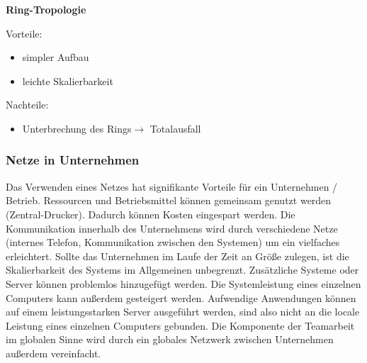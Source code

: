 \documentclass[12pt,a4paper]{article}
\begin{document}
\begin{minipage}[t]{.48\textwidth}
				\vspace{0.3cm}
				{\normalsize\textbf{Ring-Tropologie}}\newline\newline
				\begin{flushright}
				\end{flushright}
				\footnotesize Vorteile:
				\begin{itemize}
					\footnotesize
					\item simpler Aufbau
					\item leichte Skalierbarkeit
					\end{itemize}
					\footnotesize Nachteile:
					\begin{itemize}
						\footnotesize
						\item Unterbrechung des Rings\newline $\longrightarrow$ Totalausfall
						\end{itemize}
			\end{minipage}
		
		\subsubsection{Netze in Unternehmen}
			Das Verwenden eines Netzes hat signifikante Vorteile für ein Unternehmen / Betrieb. Ressourcen und Betriebsmittel können gemeinsam genutzt werden (Zentral-Drucker). Dadurch können Kosten eingespart werden. Die Kommunikation innerhalb des Unternehmens wird durch verschiedene Netze (internes Telefon, Kommunikation zwischen den Systemen) um ein vielfaches erleichtert. Sollte das Unternehmen im Laufe der Zeit an Größe zulegen, ist die Skalierbarkeit des Systems im Allgemeinen unbegrenzt. Zusätzliche Systeme oder Server können problemlos hinzugefügt werden. Die Systemleistung eines einzelnen Computers kann außerdem gesteigert werden. Aufwendige Anwendungen können auf einem leistungsstarken Server ausgeführt werden, sind also nicht an die locale Leistung eines einzelnen Computers gebunden. Die Komponente der Teamarbeit im globalen Sinne wird durch ein globales Netzwerk zwischen Unternehmen außerdem vereinfacht.
		
\end{document}
